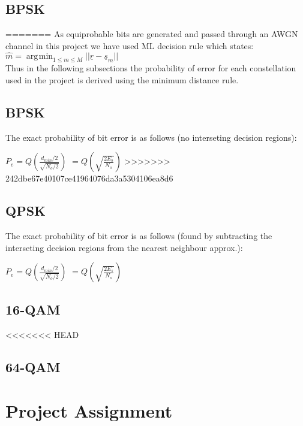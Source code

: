 \documentclass[]{article}
\DeclareMathOperator*{\argmin}{\arg\!\min}
\begin{document}
\subsection{BPSK}
\label{sec:bpsk}

=======
As equiprobable bits are generated and passed through an AWGN channel in this project we have used ML decision rule which states: \\

$\hat{m} = \argmin_{1\leq m \leq M}{||\underline{r} - \underline{s}_m||}$ 
\\

Thus in the following subsections the probability of error for each constellation used in the project is derived using the minimum distance rule.


\subsection{BPSK}
The exact probability of bit error is as follows (no interseting decision regions):

$ P_e = Q(\frac{d_{min}/2}{\sqrt{N_o/2}}) $
$       = Q(\sqrt{\frac{2E_b}{N_o}}) $
>>>>>>> 242dbe67e40107ce41964076da3a5304106ea8d6

\subsection{QPSK}
\label{sec:qpsk}

The exact probability of bit error is as follows (found by subtracting the interseting decision regions from the nearest neighbour approx.):

$ P_e = Q(\frac{d_{min}/2}{\sqrt{N_o/2}}) $
$       = Q(\sqrt{\frac{2E_s}{N_o}}) $ 

\subsection{16-QAM}
<<<<<<< HEAD
\label{sec:qam16}

\subsection{64-QAM}
\label{sec:qam64}

\appendix
\newpage
\section{Project Assignment}
\label{app:assign}

\cleardoublepage
\newpage
\end{document}
